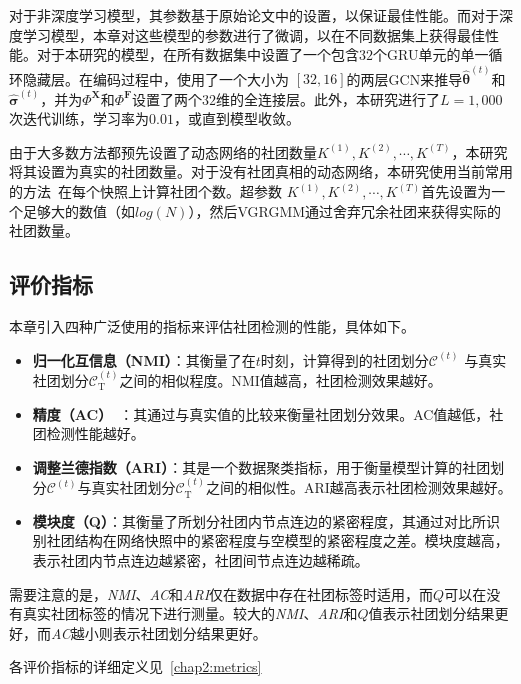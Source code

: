 对于非深度学习模型，其参数基于原始论文中的设置，以保证最佳性能。而对于深度学习模型，本章对这些模型的参数进行了微调，以在不同数据集上获得最佳性能。对于本研究的模型，在所有数据集中设置了一个包含$32$个GRU单元的单一循环隐藏层。在编码过程中，使用了一个大小为 $[32,16]$的两层GCN来推导$\hat{\bm{\theta}}^{(t)}$和$\hat{\bm{\sigma}}^{(t)}$，并为$\Phi^{\mathbf{X}}$和$\Phi^{\mathbf{F}}$设置了两个$32$维的全连接层。此外，本研究进行了$L=1,000$次迭代训练，学习率为$0.01$，或直到模型收敛。

由于大多数方法都预先设置了动态网络的社团数量$K^{(1)}, K^{(2)}, \cdots, K^{(T)}$，本研究将其设置为真实的社团数量。对于没有社团真相的动态网络，本研究使用当前常用的方法~\cite{Krzakala.2013.Zhang}在每个快照上计算社团个数。超参数 $K^{(1)},K^{(2)},\cdots,K^{(T)}$首先设置为一个足够大的数值（如$log(N)$），然后VGRGMM通过舍弃冗余社团来获得实际的社团数量。


\subsection{评价指标}
本章引入四种广泛使用的指标来评估社团检测的性能，具体如下。
\begin{itemize}
  \item \textbf{归一化互信息（NMI）}：其衡量了在$t$时刻，计算得到的社团划分$\mathcal{C}^{(t)}$ 与真实社团划分$\mathcal{C}_{\mathrm{T}}^{(t)}$之间的相似程度。NMI值越高，社团检测效果越好。
\item \textbf{精度（AC）}~\cite{folino2013evolutionary}：其通过与真实值的比较来衡量社团划分效果。AC值越低，社团检测性能越好。

\item \textbf{调整兰德指数（ARI）}：其是一个数据聚类指标，用于衡量模型计算的社团划分$\mathcal{C}^{(t)}$与真实社团划分$\mathcal{C}_{\mathrm{T}}^{(t)}$之间的相似性。ARI越高表示社团检测效果越好。

\item \textbf{模块度（Q）}：其衡量了所划分社团内节点连边的紧密程度，其通过对比所识别社团结构在网络快照中的紧密程度与空模型的紧密程度之差。模块度越高，表示社团内节点连边越紧密，社团间节点连边越稀疏。
\end{itemize}
需要注意的是，\emph{NMI}、\emph{AC}和\emph{ARI}仅在数据中存在社团标签时适用，而$Q$可以在没有真实社团标签的情况下进行测量。较大的\emph{NMI}、\emph{ARI}和$Q$值表示社团划分结果更好，而\emph{AC}越小则表示社团划分结果更好。

各评价指标的详细定义见~\ref{chap2:metrics}




